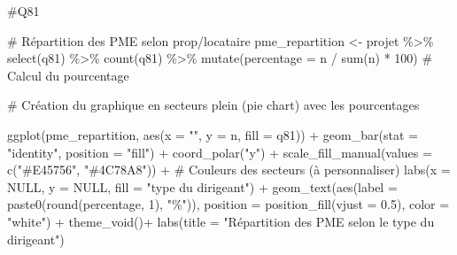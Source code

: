 \documentclass[
  letterpaper,
  DIV=11,
  numbers=noendperiod]{scrartcl}
\newenvironment{Shaded}{\begin{snugshade}}{\end{snugshade}}
\newcommand{\AttributeTok}[1]{\textcolor[rgb]{0.40,0.45,0.13}{#1}}
\newcommand{\CommentTok}[1]{\textcolor[rgb]{0.37,0.37,0.37}{#1}}
\newcommand{\ConstantTok}[1]{\textcolor[rgb]{0.56,0.35,0.01}{#1}}
\newcommand{\DecValTok}[1]{\textcolor[rgb]{0.68,0.00,0.00}{#1}}
\newcommand{\FloatTok}[1]{\textcolor[rgb]{0.68,0.00,0.00}{#1}}
\newcommand{\FunctionTok}[1]{\textcolor[rgb]{0.28,0.35,0.67}{#1}}
\newcommand{\NormalTok}[1]{\textcolor[rgb]{0.00,0.23,0.31}{#1}}
\newcommand{\OtherTok}[1]{\textcolor[rgb]{0.00,0.23,0.31}{#1}}
\newcommand{\SpecialCharTok}[1]{\textcolor[rgb]{0.37,0.37,0.37}{#1}}
\newcommand{\StringTok}[1]{\textcolor[rgb]{0.13,0.47,0.30}{#1}}
\begin{document}
\begin{Shaded}
\begin{Highlighting}[]
\CommentTok{\#Q81}


\CommentTok{\# Répartition des PME selon prop/locataire }
\NormalTok{pme\_repartition }\OtherTok{\textless{}{-}}\NormalTok{ projet }\SpecialCharTok{\%\textgreater{}\%}
  \FunctionTok{select}\NormalTok{(q81) }\SpecialCharTok{\%\textgreater{}\%}
  \FunctionTok{count}\NormalTok{(q81) }\SpecialCharTok{\%\textgreater{}\%}
  \FunctionTok{mutate}\NormalTok{(}\AttributeTok{percentage =}\NormalTok{ n }\SpecialCharTok{/} \FunctionTok{sum}\NormalTok{(n) }\SpecialCharTok{*} \DecValTok{100}\NormalTok{)  }\CommentTok{\# Calcul du pourcentage}

\CommentTok{\# Création du graphique en secteurs plein (pie chart) avec les pourcentages}

\FunctionTok{ggplot}\NormalTok{(pme\_repartition, }\FunctionTok{aes}\NormalTok{(}\AttributeTok{x =} \StringTok{""}\NormalTok{, }\AttributeTok{y =}\NormalTok{ n, }\AttributeTok{fill =}\NormalTok{ q81)) }\SpecialCharTok{+}
  \FunctionTok{geom\_bar}\NormalTok{(}\AttributeTok{stat =} \StringTok{"identity"}\NormalTok{, }\AttributeTok{position =} \StringTok{"fill"}\NormalTok{) }\SpecialCharTok{+}
  \FunctionTok{coord\_polar}\NormalTok{(}\StringTok{"y"}\NormalTok{) }\SpecialCharTok{+}
  \FunctionTok{scale\_fill\_manual}\NormalTok{(}\AttributeTok{values =} \FunctionTok{c}\NormalTok{(}\StringTok{"\#E45756"}\NormalTok{, }\StringTok{"\#4C78A8"}\NormalTok{)) }\SpecialCharTok{+}  \CommentTok{\# Couleurs des secteurs (à personnaliser)}
  \FunctionTok{labs}\NormalTok{(}\AttributeTok{x =} \ConstantTok{NULL}\NormalTok{, }\AttributeTok{y =} \ConstantTok{NULL}\NormalTok{, }\AttributeTok{fill =} \StringTok{"type du dirigeant"}\NormalTok{) }\SpecialCharTok{+}
  \FunctionTok{geom\_text}\NormalTok{(}\FunctionTok{aes}\NormalTok{(}\AttributeTok{label =} \FunctionTok{paste0}\NormalTok{(}\FunctionTok{round}\NormalTok{(percentage, }\DecValTok{1}\NormalTok{), }\StringTok{"\%"}\NormalTok{)), }\AttributeTok{position =} \FunctionTok{position\_fill}\NormalTok{(}\AttributeTok{vjust =} \FloatTok{0.5}\NormalTok{), }\AttributeTok{color =} \StringTok{"white"}\NormalTok{) }\SpecialCharTok{+}
  \FunctionTok{theme\_void}\NormalTok{()}\SpecialCharTok{+}
  \FunctionTok{labs}\NormalTok{(}\AttributeTok{title =} \StringTok{"Répartition des PME selon le type du dirigeant"}\NormalTok{)}
\end{Highlighting}
\end{Shaded}
\end{document}
